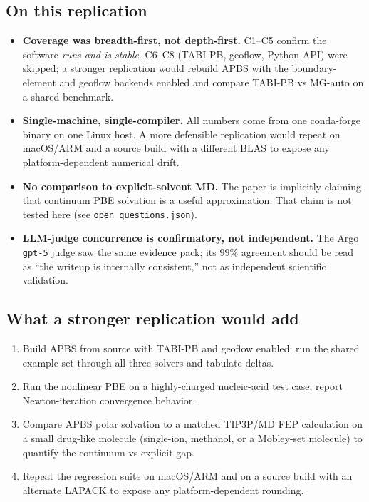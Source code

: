 \documentclass[11pt]{article}
\begin{document}
\subsection*{On this replication}

\begin{itemize}
  \item \textbf{Coverage was breadth-first, not depth-first.} C1--C5
        confirm the software \emph{runs and is stable}. C6--C8 (TABI-PB,
        geoflow, Python API) were skipped; a stronger replication would
        rebuild APBS with the boundary-element and geoflow backends
        enabled and compare TABI-PB vs MG-auto on a shared benchmark.
  \item \textbf{Single-machine, single-compiler.} All numbers come from
        one conda-forge binary on one Linux host. A more defensible
        replication would repeat on macOS/ARM and a source build with
        a different BLAS to expose any platform-dependent numerical
        drift.
  \item \textbf{No comparison to explicit-solvent MD.} The paper is
        implicitly claiming that continuum PBE solvation is a useful
        approximation. That claim is not tested here (see
        \texttt{open\_questions.json}).
  \item \textbf{LLM-judge concurrence is confirmatory, not independent.}
        The Argo \texttt{gpt-5} judge saw the same evidence pack; its
        99\% agreement should be read as ``the writeup is internally
        consistent,'' not as independent scientific validation.
\end{itemize}

\subsection*{What a stronger replication would add}

\begin{enumerate}
  \item Build APBS from source with TABI-PB and geoflow enabled; run the
        shared example set through all three solvers and tabulate deltas.
  \item Run the nonlinear PBE on a highly-charged nucleic-acid test
        case; report Newton-iteration convergence behavior.
  \item Compare APBS polar solvation to a matched TIP3P/MD FEP
        calculation on a small drug-like molecule (single-ion, methanol,
        or a Mobley-set molecule) to quantify the continuum-vs-explicit
        gap.
  \item Repeat the regression suite on macOS/ARM and on a source build
        with an alternate LAPACK to expose any platform-dependent
        rounding.
\end{enumerate}
\end{document}
